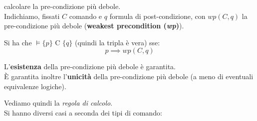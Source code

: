				      				calcolare la pre-condizione più debole.\\
				      				Indichiamo, fissati $C$ comando e $q$ formula di post-condizione, con $wp(C, q)$
				      				la pre-condizione più debole (\textbf{weakest precondition (\textit{wp})}).
				      				\begin{teorema}
				      					Si ha che $\vDash\{p\}\mbox{ C }\{q\}$ (quindi la tripla è vera) sse:
				      					\[p\implies wp(C,q)\]
				      				\end{teorema}
				      				\begin{teorema}
				      					L'\textbf{esistenza} della pre-condizione più debole è garantita.\\
				      					È garantita inoltre l'\textbf{unicità} della pre-condizione più debole (a meno
				      					di eventuali equivalenze logiche).
				      				\end{teorema}
				      				Vediamo quindi la \textit{regola di calcolo}.\\
				      				Si hanno diversi casi a seconda dei tipi di comando:

